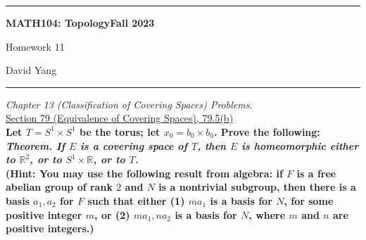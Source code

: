 \documentclass[11pt]{article}
\newcommand{\R}{\mathbb{R}}
\begin{document}
	\hrule
	\begin{center}
        \textbf{MATH104: Topology}\hfill \textbf{Fall 2023}\newline

		{\Large Homework 11}

		David Yang
	\end{center}

\hrule

\vspace{1em}

\textit{Chapter 13 (Classification of Covering Spaces) Problems.} \\

\underline{Section 79 (Equivalence of Covering Spaces), 79.5(b)} \\

\textbf{Let $T = S^1 \times S^1$ be the torus; let $x_0 = b_0 \times b_0$. Prove the following:} \\

\textbf{\textit{Theorem. If $E$ is a covering space of $T$, then $E$ is homeomorphic either to $\R^2$, or to $S^1 \times \R$, or to $T$.}} \\

\textbf{(Hint: You may use the following result from algebra: if $F$ is a free abelian group of rank $2$ and $N$ is a nontrivial subgroup, then there is a basis $a_1, a_2$ for $F$ 
such that either (1) $ma_1$ is a basis for $N$, for some positive integer $m$,
or (2) $ma_1, na_2$ is a basis for $N$, where $m$ and $n$ are positive integers.)}
\end{document}
